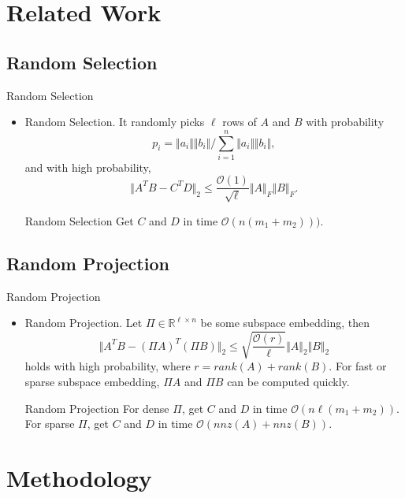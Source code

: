 \documentclass{beamer}
\def\MO{{\mathcal O}}
\def\BR{{\mathbb R}}
\begin{document}
\section{Related Work}
\subsection{Random Selection}
\begin{frame}{Random Selection}
  \begin{itemize}
  \item {
    Random Selection. 
    It randomly picks $\ell$ rows of $A$ and $B$ with probability 
    $$p_i=\Vert a_i \Vert \Vert b_i \Vert /  \sum_{i=1}^n \Vert a_i \Vert \Vert b_i \Vert,$$
    and with high probability, 
    $$\Vert A^TB - C^TD \Vert_2 \leq \frac{\MO(1)}{\sqrt{\ell}} \Vert A \Vert_F \Vert B \Vert_F.$$    
  }
 	\begin{block}{Random Selection}
 		Get $C$ and $D$ in time $\MO(n(m_1+m_2)))$. %
 	\end{block}
 
  \end{itemize}
\end{frame}

\subsection{Random Projection}
\begin{frame}{Random Projection}
\begin{itemize}
	\item{
		Random Projection. 
	Let $\Pi\in \BR^{\ell \times n}$  be some subspace embedding, then  
	$$\Vert A^TB -  (\Pi A)^T(\Pi B)  \Vert_2 \leq \sqrt{\frac{\MO(r)}{\ell}} \Vert A \Vert_2 \Vert B \Vert_2 $$
	holds with high probability, where $r=rank(A)+rank(B)$. For fast or sparse subspace embedding, $\Pi A$ and $\Pi B$ can be computed quickly. 
}
	\begin{block}{Random Projection}
		For dense $\Pi$, get $C$ and $D$ in time $\MO(n\ell(m_1+m_2))$.  \\%
		For sparse $\Pi$, get $C$ and $D$ in time $\MO(nnz(A)+nnz(B))$. %
	\end{block}

\end{itemize}
\end{frame}

\section{Methodology}
\end{document}
